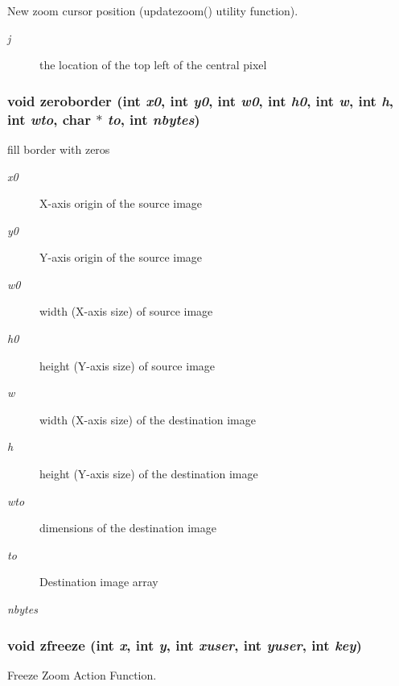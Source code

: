 New zoom cursor position (updatezoom() utility function). 

\begin{Desc}
\item[Parameters:]
\begin{description}
\item[{\em j}]the location of the top left of the central pixel \end{description}
\end{Desc}
\subsubsection{\setlength{\rightskip}{0pt plus 5cm}void zeroborder (int {\em x0}, int {\em y0}, int {\em w0}, int {\em h0}, int {\em w}, int {\em h}, int {\em wto}, char $\ast$ {\em to}, int {\em nbytes})}\label{xtv_8h_a123}


fill border with zeros 

\begin{Desc}
\item[Parameters:]
\begin{description}
\item[{\em x0}]X-axis origin of the source image \item[{\em y0}]Y-axis origin of the source image \item[{\em w0}]width (X-axis size) of source image \item[{\em h0}]height (Y-axis size) of source image \item[{\em w}]width (X-axis size) of the destination image \item[{\em h}]height (Y-axis size) of the destination image \item[{\em wto}]dimensions of the destination image \item[{\em to}]Destination image array \item[{\em nbytes}]\end{description}
\end{Desc}
\subsubsection{\setlength{\rightskip}{0pt plus 5cm}void zfreeze (int {\em x}, int {\em y}, int {\em xuser}, int {\em yuser}, int {\em key})}\label{xtv_8h_a109}


Freeze Zoom Action Function. 

